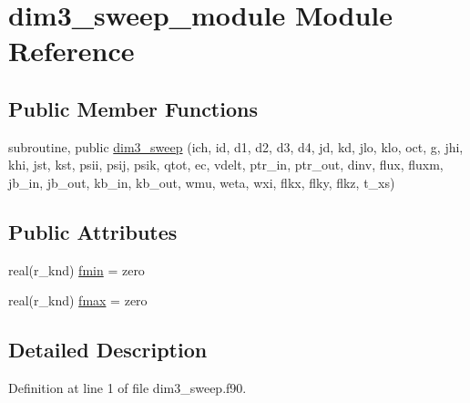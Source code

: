 \hypertarget{classdim3__sweep__module}{\section{dim3\-\_\-sweep\-\_\-module Module Reference}
\label{classdim3__sweep__module}
}
\subsection*{Public Member Functions}
\begin{DoxyCompactItemize}
\item 
subroutine, public \hyperlink{classdim3__sweep__module_a201ea00518f54fac4152d4ce277de50d}{dim3\-\_\-sweep} (ich, id, d1, d2, d3, d4, jd, kd, jlo, klo, oct, g, jhi, khi, jst, kst, psii, psij, psik, qtot, ec, vdelt, ptr\-\_\-in, ptr\-\_\-out, dinv, flux, fluxm, jb\-\_\-in, jb\-\_\-out, kb\-\_\-in, kb\-\_\-out, wmu, weta, wxi, flkx, flky, flkz, t\-\_\-xs)
\end{DoxyCompactItemize}
\subsection*{Public Attributes}
\begin{DoxyCompactItemize}
\item 
real(r\-\_\-knd) \hyperlink{classdim3__sweep__module_a5ec448e8a99070a51d62e75a430a9c60}{fmin} = zero
\item 
real(r\-\_\-knd) \hyperlink{classdim3__sweep__module_aac295110595a9c85602d58906d51cd46}{fmax} = zero
\end{DoxyCompactItemize}


\subsection{Detailed Description}


Definition at line 1 of file dim3\-\_\-sweep.\-f90.



